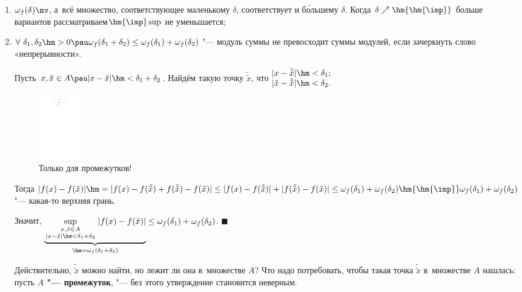 \documentclass[a4paper,10pt,twoside]{article}
\newenvironment{Proof}
       {\par\noindent{\textbf{Доказательство.}}}
       {\hfill$\scriptstyle\blacksquare$}
\begin{document}
 \begin{enumerate}
\item $\omega_f(\delta)\nv$, а~всё множество, соответствующее маленькому $\delta$, соответствует и б\'{о}льшему $\delta$.
    Когда $\delta \nearrow\hm{\hm{\imp}}$ больше вариантов
    рассматриваем$\hm{\imp} \sup$ не уменьшается;

\item \label{wf2}$\forall\  \delta_1,\delta_2\hm>0\pau \omega_f(\delta_1+\delta_2)\leq \omega_f(\delta_1)+\omega_f(\delta_2)$ "---
    модуль суммы не превосходит суммы модулей, если зачеркнуть слово «непрерывности».


\begin{Proof}
Пусть $x,\tilde x\in A\pau |x-\tilde x|\hm<\delta_1+\delta_2$. Найдём такую точку $\tilde{\tilde x}$, что $\begin{matrix}
    |x-\tilde{\tilde x}|\hm<\delta_1;\\
    |\tilde x-\tilde{\tilde x}|\hm<\delta_2.
\end{matrix}$

\begin{figure}[htbp]\centering
\includegraphics[height=2.7cm]{img/final/galat/Rasr/delt.pdf}\caption{Только для промежутков!}
\end{figure}

Тогда $|f(x)-f(\tilde x)|\hm=|f(x)-f(\tilde{\tilde x})+f(\tilde{\tilde x})-f(\tilde x)|\leq
|f(x)-f(\tilde{\tilde x})|+|f(\tilde{\tilde x})-f(\tilde x)|
\leq \omega_f(\delta_1)+\omega_f(\delta_2)\hm{\hm{\imp}} \omega_f(\delta_1)+\omega_f(\delta_2)$ "--- какая-то верхняя грань.

Значит, $\underbrace{\sup\limits_{\begin{smallmatrix}
    x,\tilde x\in A\\ |x-\tilde x|\hm<\delta_1+\delta_2
    \end{smallmatrix}}|f(x)-f(\tilde x)|}_{\hm=\omega_f(\delta_1+\delta_2)}
    \leq \omega_f(\delta_1)+\omega_f(\delta_2)$.
\end{Proof}

Действительно, $\tilde{\tilde x}$ можно найти, но лежит ли она в~множестве $A$? Что надо потребовать, чтобы такая точка $\tilde{\tilde x}$ в~множестве $A$ нашлась:
пусть \textbf{$A$ "--- промежуток}, "--- без этого утверждение становится неверным.


\end{enumerate}
\end{document}

